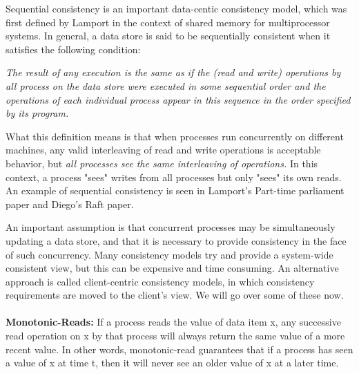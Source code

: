 \documentclass[9pt]{extarticle} %
\begin{document}
%
%
\begin{minipage}[t]{.61\linewidth} %
\vspace{-0.4cm}
\hypertarget{firstnews}{}
Sequential consistency is an important data-centic consistency model, which was first defined by Lamport in the context of shared memory for multiprocessor systems. In general, a data store is said to be sequentially consistent when it satisfies the following condition:
\begin{changemargin}{0.6cm}{0.6cm} 
\textit{The result of any execution is the same as if the (read and write) operations by all process on the data store were executed in some sequential order and the operations of each individual process appear in this sequence in the order specified by its program.}
\end{changemargin}
What this definition means is that when processes run concurrently on different machines, any valid interleaving of read and write operations is acceptable behavior, but \textit{all processes see the same interleaving of operations.} In this context, a process "sees" writes from all processes but only "sees" its own reads. An example of sequential consistency is seen in Lamport's Part-time parliament paper and Diego's Raft paper.


\hypertarget{secondnews}{}

An important assumption is that concurrent processes may be simultaneously updating a data store, and that it is necessary to provide consistency in the face of such concurrency. Many consistency models try and provide a system-wide consistent view, but this can be expensive and time consuming. An alternative approach is called client-centric consistency models, in which consistency requirements are moved to the client's view. We will go over some of these now. \\
\\
\textbf{Monotonic-Reads:} If a process reads the value of data item x, any successive read operation on x by that process will always return the same value of a more recent value. In other words, monotonic-read guarantees that if a process has seen a value of x at time t, then it will never see an older value of x at a later time.


\end{minipage}
\end{document}
